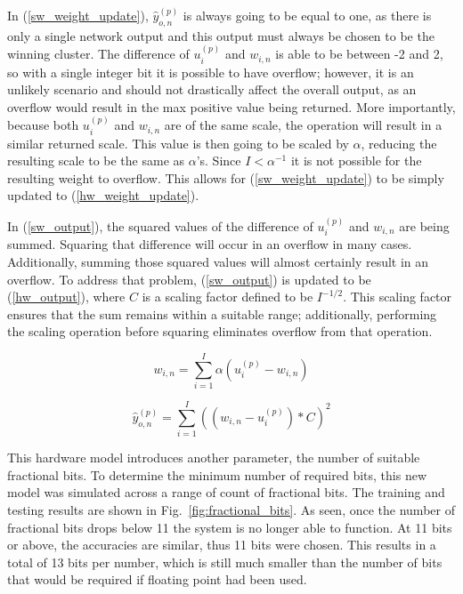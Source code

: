 \documentclass[10pt,journal]{IEEEtran}
\newcommand{\fig}[1]{Fig.~\ref{#1}}
\newcommand{\eq}[1]{(\ref{#1})}
\begin{document}
				In \eq{sw_weight_update}, \(\hat{y}_{o,n}^{(p)}\) is always going to be equal to one, as there is only a single network output and this output must always be chosen to be the winning cluster. The difference of \(u_i^{(p)}\) and \(w_{i,n}\) is able to be between -2 and 2, so with a single integer bit it is possible to have overflow; however, it is an unlikely scenario and should not drastically affect the overall output, as an overflow would result in the max positive value being returned. More importantly, because both \(u_i^{(p)}\) and \(w_{i,n}\) are of the same scale, the operation will result in a similar returned scale. This value is then going to be scaled by \(\alpha\), reducing the resulting scale to be the same as \(\alpha\)'s. Since \(I < \alpha^{-1}\) it is not possible for the resulting weight to overflow. This allows for \eq{sw_weight_update} to be simply updated to \eq{hw_weight_update}.
				
				In \eq{sw_output}, the squared values of the difference of \(u_i^{(p)}\) and \(w_{i,n}\) are being summed. Squaring that difference will occur in an overflow in many cases. Additionally, summing those squared values will almost certainly result in an overflow. To address that problem, \eq{sw_output} is updated to be \eq{hw_output}, where \(C\) is a scaling factor defined to be \(I^{-1/2}\). This scaling factor ensures that the sum remains within a suitable range; additionally, performing the scaling operation before squaring eliminates overflow from that operation.
				
				\begin{equation}
					\label{hw_weight_update}
					w_{i,n} = \displaystyle\sum_{i=1}^{I}\alpha(u_i^{(p)}-w_{i,n})
				\end{equation}
				
				\begin{equation}
					\label{hw_output}
					\hat{y}_{o,n}^{(p)} = \displaystyle\sum_{i=1}^{I}((w_{i,n} - u_i^{(p)})*C)^2
				\end{equation}
				
				This hardware model introduces another parameter, the number of suitable fractional bits. To determine the minimum number of required bits, this new model was simulated across a range of count of fractional bits. The training and testing results are shown in \fig{fig:fractional_bits}. As seen, once the number of fractional bits drops below 11 the system is no longer able to function. At 11 bits or above, the accuracies are similar, thus 11 bits were chosen. This results in a total of 13 bits per number, which is still much smaller than the number of bits that would be required if floating point had been used.
				
\end{document}
